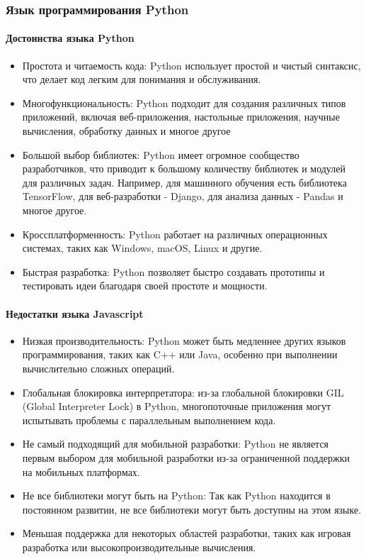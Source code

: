 \subsubsection{Язык программирования Python}

\paragraph{Достоинства языка Python}
\begin{itemize}
	\item Простота и читаемость кода: Python использует простой и чистый синтаксис, что делает код легким для понимания и обслуживания.
	\item Многофункциональность: Python подходит для создания различных типов приложений, включая веб-приложения, настольные приложения, научные вычисления, обработку данных и многое другое
	\item Большой выбор библиотек: Python имеет огромное сообщество разработчиков, что приводит к большому количеству библиотек и модулей для различных задач. Например, для машинного обучения есть библиотека TensorFlow, для веб-разработки - Django, для анализа данных - Pandas и многое другое.
	\item Кроссплатформенность: Python работает на различных операционных системах, таких как Windows, macOS, Linux и другие.
	\item Быстрая разработка: Python позволяет быстро создавать прототипы и тестировать идеи благодаря своей простоте и мощности.
\end{itemize}

\paragraph{Недостатки языка Javascript}

\begin{itemize}
	\item Низкая производительность: Python может быть медленнее других языков программирования, таких как C++ или Java, особенно при выполнении вычислительно сложных операций.
	\item Глобальная блокировка интерпретатора: из-за глобальной блокировки GIL (Global Interpreter Lock) в Python, многопоточные приложения могут испытывать проблемы с параллельным выполнением кода.
	\item Не самый подходящий для мобильной разработки: Python не является первым выбором для мобильной разработки из-за ограниченной поддержки на мобильных платформах.
	\item Не все библиотеки могут быть на Python: Так как Python находится в постоянном развитии, не все библиотеки могут быть доступны на этом языке.
	\item Меньшая поддержка для некоторых областей разработки, таких как игровая разработка или высокопроизводительные вычисления.
\end{itemize}

